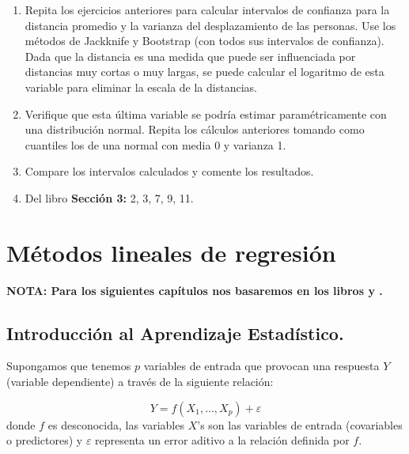 \documentclass[
  12pt,
]{book}
\theoremstyle{definition}
\theoremstyle{definition}
\theoremstyle{definition}
\theoremstyle{definition}
\theoremstyle{remark}
\begin{document}
\begin{enumerate}
\def\labelenumi{\arabic{enumi}.}
\item
  Repita los ejercicios anteriores para calcular intervalos de confianza para la distancia promedio y la varianza del desplazamiento de las personas. Use los métodos de Jackknife y Bootstrap (con todos sus intervalos de confianza).
  Dada que la distancia es una medida que puede ser influenciada por distancias muy cortas o muy largas, se puede calcular el logaritmo de esta variable para eliminar la escala de la distancias.
\item
  Verifique que esta última variable se podría estimar paramétricamente con una distribución normal.
  Repita los cálculos anteriores tomando como cuantiles los de una normal con media 0 y varianza 1.
\item
  Compare los intervalos calculados y comente los resultados.
\item
  Del libro \autocite{Wasserman2006} \textbf{Sección 3:} 2, 3, 7, 9, 11.
\end{enumerate}

\hypertarget{muxe9todos-lineales-de-regresiuxf3n}{%
\chapter{Métodos lineales de regresión}\label{muxe9todos-lineales-de-regresiuxf3n}}

\textbf{NOTA: Para los siguientes capítulos nos basaremos en los libros \autocite{HastieElements2009} y \autocite{James2013b}.}

\hypertarget{introducciuxf3n-al-aprendizaje-estaduxedstico.}{%
\section{Introducción al Aprendizaje Estadístico.}\label{introducciuxf3n-al-aprendizaje-estaduxedstico.}}

Supongamos que tenemos \(p\) variables de entrada que provocan una respuesta \(Y\) (variable dependiente) a través de la siguiente relación:

\begin{equation}
Y = f(X_{1},\ldots,X_{p}) + \varepsilon
\label{eq:regresion-general}
\end{equation}
donde \(f\) es desconocida, las variables \(X\)'s son las variables de entrada (covariables o predictores) y \(\varepsilon\) representa un error aditivo a la relación definida por \(f\).
\end{document}
